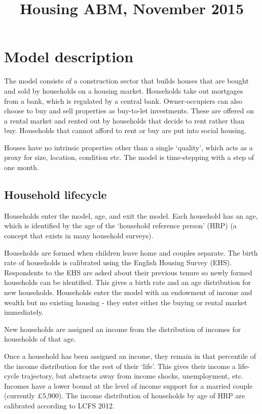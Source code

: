 \documentclass{article}
\begin{document}
\title{Housing ABM, November 2015}
\maketitle


\section{Model description}

The model consists of a construction sector that builds houses that are
bought and sold by households on a housing market. Households take out
mortgages from a bank, which is regulated by a central bank. Owner-occupiers
can also choose to buy and sell properties as buy-to-let investments. These
are offered on a rental market and rented out by households that decide to
rent rather than buy. Households that cannot afford to rent or buy are put
into social housing.

Houses have no intrinsic properties other than a single `quality', which
acts as a proxy for size, location, condition etc. The model is
time-stepping with a step of one month.

\subsection{Household lifecycle}

Households enter the model, age, and exit the model. Each household has an
age, which is identified by the age of the `household reference person'
(HRP) (a concept that exists in many household surveys).

Households are formed when children leave home and couples separate. The
birth rate of households is calibrated using the English Housing Survey
(EHS). Respondents to the EHS are asked about their previous tenure so newly
formed households can be identified. This gives a birth rate and an age
distribution for new households. Households enter the model with an
endowment of income and wealth but no existing housing - they enter either
the buying or rental market immediately.

New households are assigned an income from the distribution of incomes for
households of that age.

Once a household has been assigned an income, they remain in that percentile
of the income distribution for the rest of their `life'. This gives their
income a life-cycle trajectory, but abstracts away from income shocks,
unemployment, etc. Incomes have a lower bound at the level of income support
for a married couple (currently \pounds 5,900). The income distribution of
households by age of HRP are calibrated according to LCFS 2012.
\end{document}
